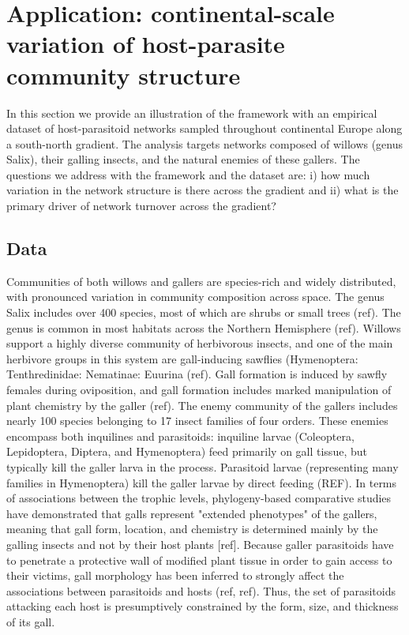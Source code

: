 \documentclass[12pt]{article}
\begin{document}
\section*{Application: continental-scale variation of host-parasite community structure}

In this section we provide an illustration of the framework with an empirical
dataset of host-parasitoid networks sampled throughout continental Europe
along a south-north gradient. The analysis targets networks composed of
willows (genus Salix), their galling insects, and the natural enemies of these
gallers. The questions we address with the framework and the dataset are: i)
how much variation in the network structure is there across the gradient and
ii) what is the primary driver of network turnover across the gradient?

\subsection*{Data}  

Communities of both willows and gallers are species-rich and widely
distributed, with pronounced variation in community composition across space.
The genus Salix includes over 400 species, most of which are shrubs or small
trees (ref). The genus is common in most habitats across the Northern
Hemisphere (ref). Willows support a highly diverse community of herbivorous
insects, and one of the main herbivore groups in this system are gall-inducing
sawflies (Hymenoptera: Tenthredinidae: Nematinae: Euurina (ref). Gall
formation is induced by sawfly females during oviposition, and gall formation
includes marked manipulation of plant chemistry by the galler (ref). The enemy
community of the gallers includes nearly 100 species belonging to 17 insect
families of four orders. These enemies encompass both inquilines and
parasitoids: inquiline larvae (Coleoptera, Lepidoptera, Diptera, and
Hymenoptera) feed primarily on gall tissue, but typically kill the galler
larva in the process. Parasitoid larvae (representing many families in
Hymenoptera) kill the galler larvae by direct feeding (REF). In terms of
associations between the trophic levels, phylogeny-based comparative studies
have demonstrated that galls represent "extended phenotypes" of the gallers,
meaning that gall form, location, and chemistry is determined mainly by the
galling insects and not by their host plants [ref]. Because galler parasitoids
have to penetrate a protective wall of modified plant tissue in order to gain
access to their victims, gall morphology has been inferred to strongly affect
the associations between parasitoids and hosts (ref, ref). Thus, the set of
parasitoids attacking each host is presumptively constrained by the form,
size, and thickness of its gall.
\end{document}
